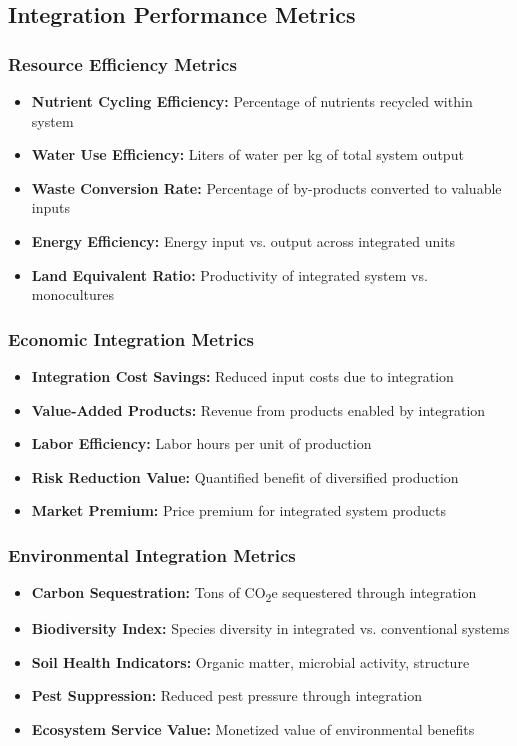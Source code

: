 \subsection{Integration Performance Metrics}

\subsubsection{Resource Efficiency Metrics}
\begin{itemize}
    \item \textbf{Nutrient Cycling Efficiency:} Percentage of nutrients recycled within system
    \item \textbf{Water Use Efficiency:} Liters of water per kg of total system output
    \item \textbf{Waste Conversion Rate:} Percentage of by-products converted to valuable inputs
    \item \textbf{Energy Efficiency:} Energy input vs. output across integrated units
    \item \textbf{Land Equivalent Ratio:} Productivity of integrated system vs. monocultures
\end{itemize}

\subsubsection{Economic Integration Metrics}
\begin{itemize}
    \item \textbf{Integration Cost Savings:} Reduced input costs due to integration
    \item \textbf{Value-Added Products:} Revenue from products enabled by integration
    \item \textbf{Labor Efficiency:} Labor hours per unit of production
    \item \textbf{Risk Reduction Value:} Quantified benefit of diversified production
    \item \textbf{Market Premium:} Price premium for integrated system products
\end{itemize}

\subsubsection{Environmental Integration Metrics}
\begin{itemize}
    \item \textbf{Carbon Sequestration:} Tons of CO\textsubscript{2}e sequestered through integration
    \item \textbf{Biodiversity Index:} Species diversity in integrated vs. conventional systems
    \item \textbf{Soil Health Indicators:} Organic matter, microbial activity, structure
    \item \textbf{Pest Suppression:} Reduced pest pressure through integration
    \item \textbf{Ecosystem Service Value:} Monetized value of environmental benefits
\end{itemize}

